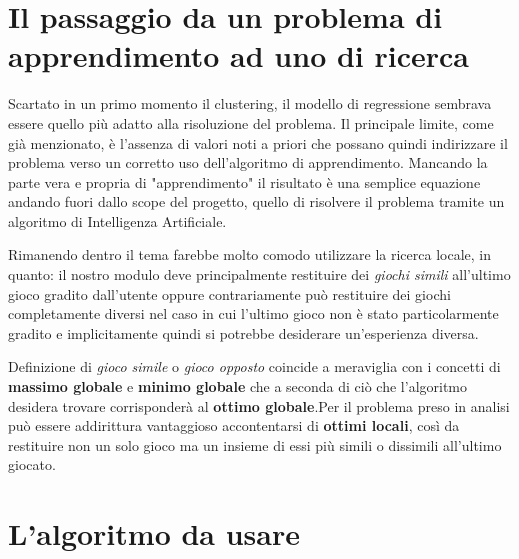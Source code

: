\section{Il passaggio da un problema di apprendimento ad uno di ricerca}
    Scartato in un primo momento il clustering, il modello di regressione sembrava essere quello più adatto alla risoluzione del problema. Il principale limite, come già menzionato, è l'assenza di valori noti a priori che possano quindi indirizzare il problema verso un corretto uso dell'algoritmo di apprendimento. Mancando la parte vera e propria di "apprendimento" il risultato è una semplice equazione andando fuori dallo scope del progetto, quello di risolvere il problema tramite un algoritmo di Intelligenza Artificiale. 
    
    Rimanendo dentro il tema farebbe molto comodo utilizzare la ricerca locale, in quanto: il nostro modulo deve principalmente restituire dei \textit{giochi simili} all'ultimo gioco gradito dall'utente oppure contrariamente può restituire dei giochi completamente diversi nel caso in cui l'ultimo gioco non è stato particolarmente gradito e implicitamente quindi si potrebbe desiderare un'esperienza diversa.
    
    Definizione di \textit{gioco simile} o \textit{gioco opposto} coincide a meraviglia con i concetti di \textbf{massimo globale} e \textbf{minimo globale} che a seconda di ciò che l'algoritmo desidera trovare corrisponderà al \textbf{ottimo globale}.Per il problema preso in analisi può essere addirittura vantaggioso accontentarsi di \textbf{ottimi locali}, così da restituire non un solo gioco ma un insieme di essi più simili o dissimili all'ultimo giocato.
    
    \section{L'algoritmo da usare}